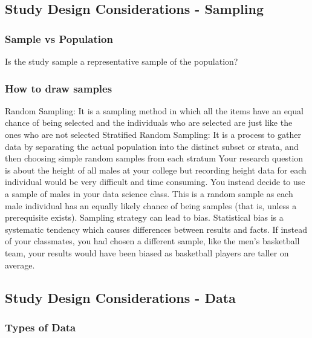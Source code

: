 \documentclass[
]{book}
\begin{document}
\hypertarget{study-design-considerations---sampling}{%
\subsection{Study Design Considerations - Sampling}\label{study-design-considerations---sampling}}

\hypertarget{sample-vs-population}{%
\subsubsection{Sample vs Population}\label{sample-vs-population}}

Is the study sample a representative sample of the population?

\hypertarget{how-to-draw-samples}{%
\subsubsection{How to draw samples}\label{how-to-draw-samples}}

Random Sampling: It is a sampling method in which all the items have an equal chance of being selected and the individuals who are selected are just like the ones who are not selected
Stratified Random Sampling: It is a process to gather data by separating the actual population into the distinct subset or strata, and then choosing simple random samples from each stratum Your research question is about the height of all males at your college but recording height data for each individual would be very difficult and time consuming. You instead decide to use a sample of males in your data science class. This is a random sample as each male individual has an equally likely chance of being samples (that is, unless a prerequisite exists).
Sampling strategy can lead to bias. Statistical bias is a systematic tendency which causes differences between results and facts. If instead of your classmates, you had chosen a different sample, like the men's basketball team, your results would have been biased as basketball players are taller on average.

\hypertarget{study-design-considerations---data}{%
\subsection{Study Design Considerations - Data}\label{study-design-considerations---data}}

\hypertarget{types-of-data}{%
\subsubsection{Types of Data}\label{types-of-data}}
\end{document}
